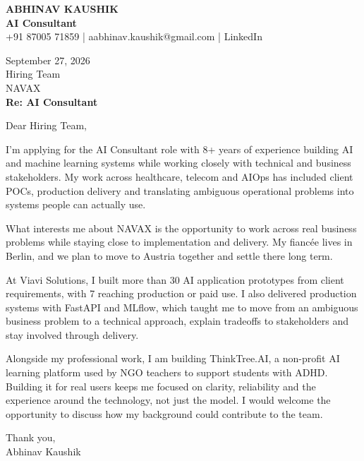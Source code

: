 \documentclass[10pt,a4paper]{article}
\begin{document}
\begin{center}
{\Large\bfseries ABHINAV KAUSHIK}\\[2pt]
{\bfseries AI Consultant}\\[2pt]
+91 87005 71859 \quad | \quad aabhinav.kaushik@gmail.com \quad | \quad LinkedIn
\end{center}
\vspace{8pt}
September 27, 2026\\[6pt]
Hiring Team\\
NAVAX\\[4pt]
\textbf{Re: AI Consultant}

Dear Hiring Team,

I’m applying for the AI Consultant role with 8+ years of experience building AI and machine learning systems while working closely with technical and business stakeholders. My work across healthcare, telecom and AIOps has included client POCs, production delivery and translating ambiguous operational problems into systems people can actually use.

What interests me about NAVAX is the opportunity to work across real business problems while staying close to implementation and delivery. My fiancée lives in Berlin, and we plan to move to Austria together and settle there long term.

At Viavi Solutions, I built more than 30 AI application prototypes from client requirements, with 7 reaching production or paid use. I also delivered production systems with FastAPI and MLflow, which taught me to move from an ambiguous business problem to a technical approach, explain tradeoffs to stakeholders and stay involved through delivery.

Alongside my professional work, I am building ThinkTree.AI, a non-profit AI learning platform used by NGO teachers to support students with ADHD. Building it for real users keeps me focused on clarity, reliability and the experience around the technology, not just the model. I would welcome the opportunity to discuss how my background could contribute to the team.

Thank you,\\
Abhinav Kaushik
\end{document}
